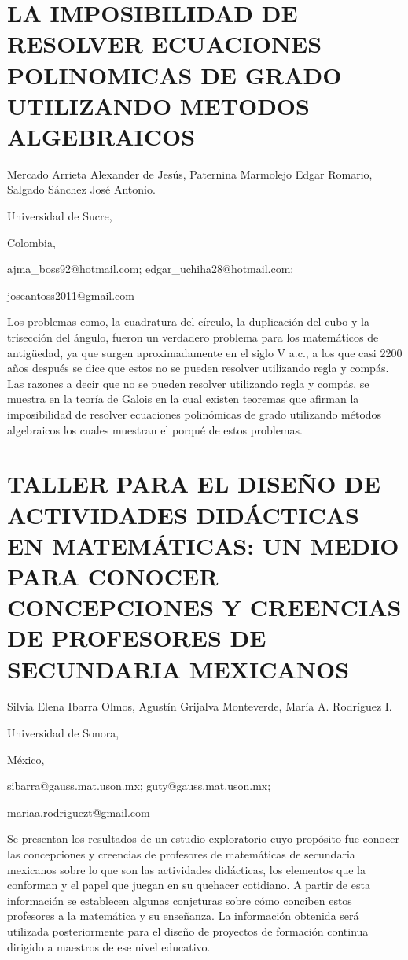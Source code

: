\section{LA IMPOSIBILIDAD DE RESOLVER ECUACIONES POLINOMICAS DE GRADO UTILIZANDO
METODOS ALGEBRAICOS}

\begin{datos}

Mercado Arrieta Alexander de Jesús, Paternina Marmolejo Edgar Romario,
Salgado Sánchez José Antonio.

Universidad de Sucre,

Colombia,

ajma\_boss92@hotmail.com; edgar\_uchiha28@hotmail.com;

joseantoss2011@gmail.com

\end{datos}

Los problemas como, la cuadratura del círculo, la duplicación del
cubo y la trisección del ángulo, fueron un verdadero problema para
los matemáticos de antigüedad, ya que surgen aproximadamente en el
siglo V a.c., a los que casi 2200 años después se dice que estos no
se pueden resolver utilizando regla y compás. Las razones a decir
que no se pueden resolver utilizando regla y compás, se muestra en
la teoría de Galois en la cual existen teoremas que afirman la imposibilidad
de resolver ecuaciones polinómicas de grado utilizando métodos algebraicos
los cuales muestran el porqué de estos problemas.


\section{TALLER PARA EL DISEÑO DE ACTIVIDADES DIDÁCTICAS EN MATEMÁTICAS: UN
MEDIO PARA CONOCER CONCEPCIONES Y CREENCIAS DE PROFESORES DE SECUNDARIA
MEXICANOS}

\begin{datos}

Silvia Elena Ibarra Olmos, Agustín Grijalva Monteverde, María A. Rodríguez
I. 

Universidad de Sonora,

México,

sibarra@gauss.mat.uson.mx; guty@gauss.mat.uson.mx; 

mariaa.rodriguezt@gmail.com

\end{datos}

Se presentan los resultados de un estudio exploratorio cuyo propósito
fue conocer las concepciones y creencias de profesores de matemáticas
de secundaria mexicanos sobre lo que son las actividades didácticas,
los elementos que la conforman y el papel que juegan en su quehacer
cotidiano. A partir de esta información se establecen algunas conjeturas
sobre cómo conciben estos profesores a la matemática y su enseñanza.
La información obtenida será utilizada posteriormente para el diseño
de proyectos de formación continua dirigido a maestros de ese nivel
educativo.

